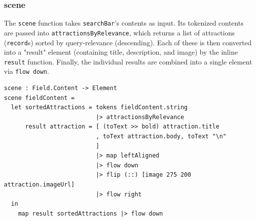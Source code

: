 \documentclass[12pt]{article}
\begin{document}
\subsubsection{scene}
The \texttt{scene} function takes \texttt{searchBar}'s contents as input. Its tokenized
contents are passed into \texttt{attractionsByRelevance}, which returns a list of 
attractions (\texttt{record}s) sorted by query-relevance (descending). Each of these
is then converted into a "result" element (containing title, description, and image)
by the inline \texttt{result} function. Finally, the individual results are combined
into a single element via \texttt{flow down}.
\begin{samepage}
\begin{verbatim}
scene : Field.Content -> Element
scene fieldContent = 
  let sortedAttractions = tokens fieldContent.string 
                          |> attractionsByRelevance
      result attraction = [ (toText >> bold) attraction.title
                          , toText attraction.body, toText "\n"
                          ] 
                          |> map leftAligned 
                          |> flow down
                          |> flip (::) [image 275 200 attraction.imageUrl]
                          |> flow right
  in 
    map result sortedAttractions |> flow down
\end{verbatim}
\end{samepage}
\end{document}
